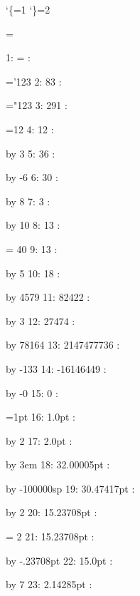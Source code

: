 \catcode`\{=1 %
\catcode`\}=2 %





 {=}

1: = : \the{}



='123
2: 83 : \the{}

="123
3: 291 : \the{}


=12
4: 12 : \the{}

\multiply {} by 3
5: 36 : \the{}

\advance {} by -6
6: 30 : \the{}

\divide {} by 8
7: 3 : \the{}

\advance {} by 10
8: 13 : \the{}


\countdef\nase = 40
9: 13 : \the\nase

\advance \nase by 5
10: 18 : \the\nase

\multiply\nase by 4579
11: 82422 : \the\nase

\divide\nase by 3
12: 27474 : \the\nase

\multiply\nase by 78164
13: 2147477736 : \the\nase

\divide\nase by -133
14: -16146449 : \the\nase

\multiply \nase by -0
15: 0 : \the\nase


=1pt
16: 1.0pt : \the{}

\multiply{} by 2
17: 2.0pt : \the{}

\advance{} by 3em
18: 32.00005pt : \the{}

\advance{} by -100000sp
19: 30.47417pt : \the{}

\divide{} by 2
20: 15.23708pt : \the{}


\dimendef\hand = 2
21: 15.23708pt : \the\hand

\advance\hand by -.23708pt
22: 15.0pt : \the\hand

\divide\hand by 7
23: 2.14285pt : \the\hand

